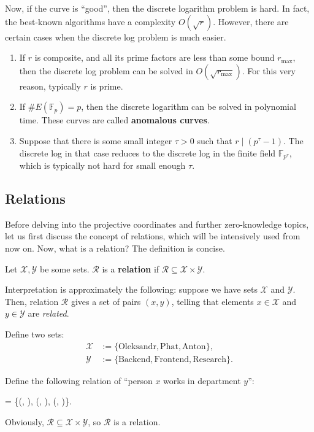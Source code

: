\documentclass[../../book.tex]{subfiles}
\begin{document}
Now, if the curve is ``good'', then the discrete logarithm problem is hard. In fact, the best-known algorithms have a complexity $O(\sqrt{r})$. However, there are certain cases when the discrete log problem is much easier.
\begin{enumerate}
    \item If $r$ is composite, and all its prime factors are less than some bound $r_{\max}$, then the discrete log problem can be solved in $O(\sqrt{r_{\max}})$. For this very reason, typically $r$ is prime.
    \item If $\#E(\mathbb{F}_p)=p$, then the discrete logarithm can be solved in polynomial time. These curves are called \textbf{anomalous curves}.
    \item Suppose that there is some small integer $\tau>0$ such that $r \mid (p^{\tau}-1)$. The discrete log in that case reduces to the discrete log in the finite field $\mathbb{F}_{p^{\tau}}$, which is typically not hard for small enough $\tau$.
\end{enumerate}

\subsection{Relations}\label{section:relations}

Before delving into the projective coordinates and further zero-knowledge topics, let us first discuss the concept of relations, which will be intensively used from now on. Now, what is a relation? The definition is concise.

\begin{definition}
    Let $\mathcal{X},\mathcal{Y}$ be some sets. $\mathcal{R}$ is a \textbf{relation} if $\mathcal{R} \subseteq \mathcal{X} \times \mathcal{Y}$.
\end{definition}

Interpretation is approximately the following: suppose we have sets $\mathcal{X}$ and $\mathcal{Y}$. Then, relation $\mathcal{R}$ gives a set of pairs $(x,y)$, telling that elements $x \in \mathcal{X}$ and $y \in \mathcal{Y}$ are \textit{related}.

\begin{example}
    Define two sets: 
    \begin{align*}
        \mathcal{X} &:= \{\text{Oleksandr}, \text{Phat}, \text{Anton}\}, \\
        \mathcal{Y} &:= \{\text{Backend}, \text{Frontend}, \text{Research}\}.
    \end{align*}

    Define the following relation of ``person $x$ works in department $y$'':
    \begin{xequation*}
         = \{(, ), (, ), (, )\}.
    \end{xequation*}
    Obviously, $\mathcal{R} \subseteq \mathcal{X} \times \mathcal{Y}$, so $\mathcal{R}$ is a relation.
\end{example}
\end{document}
